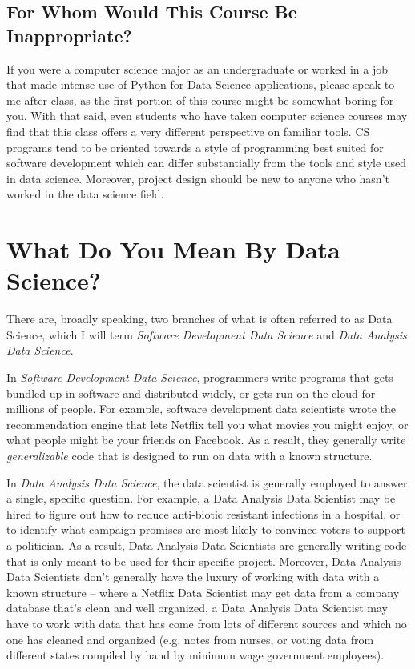 \documentclass[12pt]{article}
\begin{document}
\subsection{For Whom Would This Course Be Inappropriate?}

If you were a computer science major as an undergraduate or worked in a job that made intense use of Python for Data Science applications, please speak to me after class, as the first portion of this course might be somewhat boring for you. With that said, even students who have taken computer science courses may find that this class offers a very different perspective on familiar tools. CS programs tend to be oriented towards a style of programming best suited for software development which can differ substantially from the tools and style used in data science. Moreover, project design should be new to anyone who hasn't worked in the data science field.

\section{What Do You Mean By Data Science?}

There are, broadly speaking, two branches of what is often referred to as Data Science, which I will term \emph{Software Development Data Science} and \emph{Data Analysis Data Science}.

In \emph{Software Development Data Science}, programmers write programs that gets bundled up in software and distributed widely, or gets run on the cloud for millions of people. For example, software development data scientists wrote the recommendation engine that lets Netflix tell you what movies you might enjoy, or what people might be your friends on Facebook. As a result, they generally write \emph{generalizable} code that is designed to run on data with a known structure.

In \emph{Data Analysis Data Science}, the data scientist is generally employed to answer a single, specific question. For example, a Data Analysis Data Scientist may be hired to figure out how to reduce anti-biotic resistant infections in a hospital, or to identify what campaign promises are most likely to convince voters to support a politician. As a result, Data Analysis Data Scientists are generally writing code that is only meant to be used for their specific project. Moreover, Data Analysis Data Scientists don't generally have the luxury of working with data with a known structure -- where a Netflix Data Scientist may get data from a company database that's clean and well organized, a Data Analysis Data Scientist may have to work with data that has come from lots of different sources and which no one has cleaned and organized (e.g. notes from nurses, or voting data from different states compiled by hand by minimum wage government employees).
\end{document}
